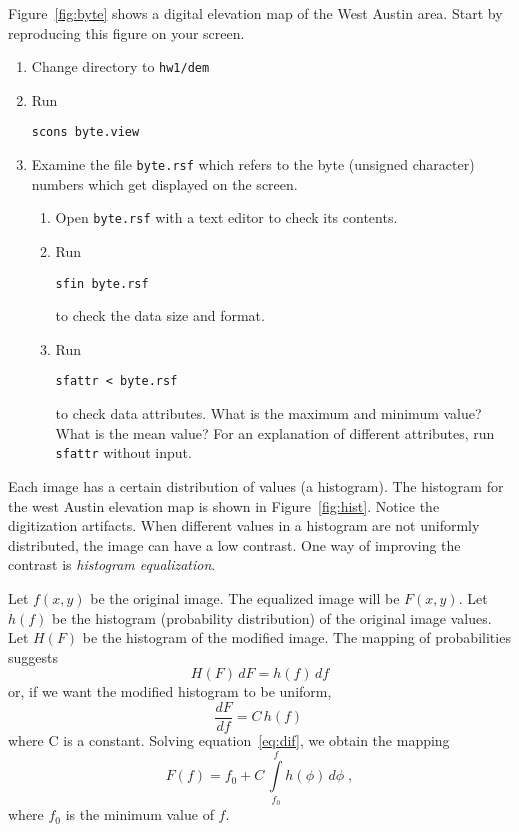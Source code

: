 
Figure~\ref{fig:byte} shows a digital elevation map of the West Austin
area. Start by reproducing this figure on your screen.
\begin{enumerate}
\item Change directory to \verb#hw1/dem#
\item Run
\begin{verbatim}
scons byte.view
\end{verbatim}
\item Examine the file \texttt{byte.rsf} which refers to the 
byte (unsigned character) numbers which get displayed on the screen.
\begin{enumerate}
\item Open \texttt{byte.rsf} with a text editor to check its contents.
\item Run
\begin{verbatim}
sfin byte.rsf
\end{verbatim}
to check the data size and format.
\item Run
\begin{verbatim}
sfattr < byte.rsf
\end{verbatim}
to check data attributes. What is the maximum and minimum value? What
is the mean value? For an explanation of different attributes,
run \texttt{sfattr} without input.
\end{enumerate}
\end{enumerate}

Each image has a certain distribution of values (a histogram). The
histogram for the west Austin elevation map is shown in
Figure~\ref{fig:hist}. Notice the digitization artifacts. When
different values in a histogram are not uniformly distributed, the
image can have a low contrast. One way of improving the contrast is
\emph{histogram equalization}.


Let $f(x,y)$ be the original image. The equalized image will be
$F(x,y)$. Let $h(f)$ be the histogram (probability distribution) of
the original image values. Let $H(F)$ be the histogram of the modified
image. The mapping of probabilities suggests
\begin{equation}
\label{eq:prob}
H(F)\,dF = h(f)\,df
\end{equation}
or, if we want the modified histogram
to be uniform, 
\begin{equation}
\label{eq:dif}
\frac{d F}{d f} = C\,h(f)\,
\end{equation}
where C is a constant. 
Solving equation~\ref{eq:dif}, we obtain the mapping
\begin{equation}
\label{eq:int}
F(f) = f_0 + C\,\int\limits_{f_0}^f h(\phi)\,d\phi\;,
\end{equation}
where $f_0$ is the minimum value of $f$.

